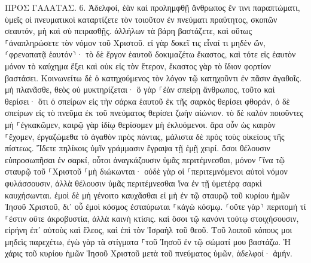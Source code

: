 \documentclass[twoside, 9pt]{extreport}
\begin{document}
ΠΡΟΣ ΓΑΛΑΤΑΣ.
6.
Ἀδελφοί, ἐὰν καὶ προλημφθῇ ἄνθρωπος ἔν τινι παραπτώματι, ὑμεῖς οἱ πνευματικοὶ καταρτίζετε τὸν τοιοῦτον ἐν πνεύματι πραΰτητος, σκοπῶν σεαυτόν, μὴ καὶ σὺ πειρασθῇς. 
ἀλλήλων τὰ βάρη βαστάζετε, καὶ οὕτως ⸀ἀναπληρώσετε τὸν νόμον τοῦ Χριστοῦ. 
εἰ γὰρ δοκεῖ τις εἶναί τι μηδὲν ὤν, ⸂φρεναπατᾷ ἑαυτόν⸃· 
τὸ δὲ ἔργον ἑαυτοῦ δοκιμαζέτω ἕκαστος, καὶ τότε εἰς ἑαυτὸν μόνον τὸ καύχημα ἕξει καὶ οὐκ εἰς τὸν ἕτερον, 
ἕκαστος γὰρ τὸ ἴδιον φορτίον βαστάσει. 
Κοινωνείτω δὲ ὁ κατηχούμενος τὸν λόγον τῷ κατηχοῦντι ἐν πᾶσιν ἀγαθοῖς. 
μὴ πλανᾶσθε, θεὸς οὐ μυκτηρίζεται· ὃ γὰρ ⸀ἐὰν σπείρῃ ἄνθρωπος, τοῦτο καὶ θερίσει· 
ὅτι ὁ σπείρων εἰς τὴν σάρκα ἑαυτοῦ ἐκ τῆς σαρκὸς θερίσει φθοράν, ὁ δὲ σπείρων εἰς τὸ πνεῦμα ἐκ τοῦ πνεύματος θερίσει ζωὴν αἰώνιον. 
τὸ δὲ καλὸν ποιοῦντες μὴ ⸀ἐγκακῶμεν, καιρῷ γὰρ ἰδίῳ θερίσομεν μὴ ἐκλυόμενοι. 
ἄρα οὖν ὡς καιρὸν ⸀ἔχομεν, ἐργαζώμεθα τὸ ἀγαθὸν πρὸς πάντας, μάλιστα δὲ πρὸς τοὺς οἰκείους τῆς πίστεως. 
Ἴδετε πηλίκοις ὑμῖν γράμμασιν ἔγραψα τῇ ἐμῇ χειρί. 
ὅσοι θέλουσιν εὐπροσωπῆσαι ἐν σαρκί, οὗτοι ἀναγκάζουσιν ὑμᾶς περιτέμνεσθαι, μόνον ⸀ἵνα τῷ σταυρῷ τοῦ ⸀Χριστοῦ ⸀μὴ διώκωνται· 
οὐδὲ γὰρ οἱ ⸀περιτεμνόμενοι αὐτοὶ νόμον φυλάσσουσιν, ἀλλὰ θέλουσιν ὑμᾶς περιτέμνεσθαι ἵνα ἐν τῇ ὑμετέρᾳ σαρκὶ καυχήσωνται. 
ἐμοὶ δὲ μὴ γένοιτο καυχᾶσθαι εἰ μὴ ἐν τῷ σταυρῷ τοῦ κυρίου ἡμῶν Ἰησοῦ Χριστοῦ, δι᾽ οὗ ἐμοὶ κόσμος ἐσταύρωται ⸀κἀγὼ κόσμῳ. 
⸂οὔτε γὰρ⸃ περιτομή τί ⸀ἐστιν οὔτε ἀκροβυστία, ἀλλὰ καινὴ κτίσις. 
καὶ ὅσοι τῷ κανόνι τούτῳ στοιχήσουσιν, εἰρήνη ἐπ᾽ αὐτοὺς καὶ ἔλεος, καὶ ἐπὶ τὸν Ἰσραὴλ τοῦ θεοῦ. 
Τοῦ λοιποῦ κόπους μοι μηδεὶς παρεχέτω, ἐγὼ γὰρ τὰ στίγματα ⸀τοῦ Ἰησοῦ ἐν τῷ σώματί μου βαστάζω. 
Ἡ χάρις τοῦ κυρίου ἡμῶν Ἰησοῦ Χριστοῦ μετὰ τοῦ πνεύματος ὑμῶν, ἀδελφοί· ἀμήν. 
\end{document}
